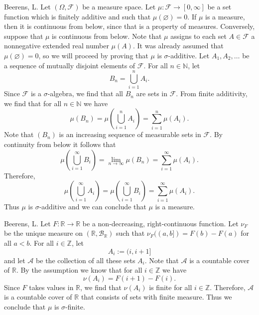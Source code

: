 \begin{solution}[3.14]{Beerens, L.}
    Let $(\Omega,\mathcal{F})$ be a measure space. Let $\mu:\mathcal{F}\rightarrow[0,\infty]$ be a set function which is finitely additive and such that $\mu(\varnothing) = 0$. If $\mu$ is a measure, then it is continuous from below, since that is a property of measures. Conversely, suppose that $\mu$ is continuous from below. Note that $\mu$ assigns to each set $A\in\mathcal{F}$ a nonnegative extended real number $\mu(A)$. It was already assumed that $\mu(\varnothing) =0$, so we will proceed by proving that $\mu$ is $\sigma$-additive. Let $A_1, A_2,\hdots$ be a sequence of mutually disjoint elements of $\mathcal{F}$. For all $n\in\mathbb{N}$, let 
    $$
        B_n = \bigcup_{i=1}^n A_i.
    $$
    Since $\mathcal{F}$ is a $\sigma$-algebra, we find that all $B_n$ are sets in $\mathcal{F}$.
    From finite additivity, we find that for all $n\in\mathbb{N}$ we have
    $$
        \mu(B_n) = \mu\left( \bigcup_{i=1}^n A_i \right) = \sum_{i=1}^n \mu(A_i). 
    $$
    Note that $(B_n)$ is an increasing sequence of measurable sets in $\mathcal{F}$. By continuity from below it follows that
    $$
        \mu\left( \bigcup_{i=1}^\infty B_i \right) = \lim_{n\rightarrow\infty}\mu(B_n) = \sum_{i=1}^\infty\mu(A_i).
    $$
    Therefore,
    $$
        \mu\left( \bigcup_{i=1}^\infty A_i \right) = \mu\left( \bigcup_{i=1}^\infty B_i \right) = \sum_{i=1}^\infty\mu(A_i).
    $$
    Thus $\mu$ is $\sigma$-additive and we can conclude that $\mu$ is a measure.
\end{solution}

\begin{solution}[3.21]{Beerens, L.}
    Let $F:\mathbb{R}\rightarrow\mathbb{R}$ be a non-decreasing, right-continuous function. Let $\nu_F$ be the unique measure on $(\mathbb{R},\mathcal{B}_\mathbb{R})$ such that $\nu_F((a,b])=F(b)-F(a)$ for all $a<b$. For all $i\in\mathbb{Z}$, let
    $$
        A_i:= (i,i+1]
    $$
    and let $\mathcal{A}$ be the collection of all these sets $A_i$. Note that $\mathcal{A}$ is a countable cover of $\mathbb{R}$. By the assumption we know that for all $i\in\mathbb{Z}$ we have
    $$
        \nu(A_i)  = F(i+1) - F(i).
    $$
    Since $F$ takes values in $\mathbb{R}$, we find that $\nu(A_i)$ is finite for all $i\in\mathbb{Z}$. Therefore, $\mathcal{A}$ is a countable cover of $\mathbb{R}$ that consists of sets with finite measure. Thus we conclude that $\mu$ is $\sigma$-finite.
\end{solution}

